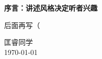 
\frontmatter
\thispagestyle{empty}
\newpage
\begin{center}
	\textbf{\LARGE 序言：讲述风格决定听者兴趣}
\end{center}

\vspace{2em}
后面再写（
%
%



\vspace{2em}

\begin{flushright}
	匡睿同学\\
	\today
\end{flushright}


